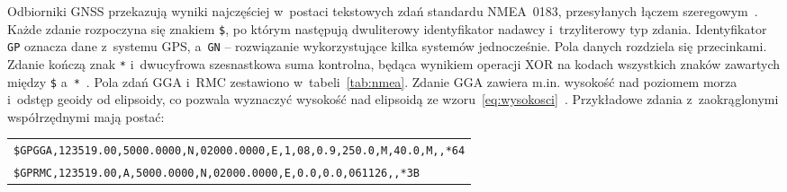 Odbiorniki GNSS przekazują wyniki najczęściej w~postaci tekstowych zdań standardu NMEA~0183, przesyłanych łączem szeregowym~\cite{nmea0183}. Każde zdanie rozpoczyna się znakiem \texttt{\$}, po którym następują dwuliterowy identyfikator nadawcy i~trzyliterowy typ zdania. Identyfikator \texttt{GP} oznacza dane z~systemu GPS, a~\texttt{GN} -- rozwiązanie wykorzystujące kilka systemów jednocześnie. Pola danych rozdziela się przecinkami. Zdanie kończą znak \texttt{*} i~dwucyfrowa szesnastkowa suma kontrolna, będąca wynikiem operacji XOR na kodach wszystkich znaków zawartych między \texttt{\$} a~\texttt{*}~\cite{gpsd_nmea}. Pola zdań GGA i~RMC zestawiono w~tabeli~\ref{tab:nmea}. Zdanie GGA zawiera m.in. wysokość nad poziomem morza i~odstęp geoidy od elipsoidy, co pozwala wyznaczyć wysokość nad elipsoidą ze wzoru~\eqref{eq:wysokosci}~\cite{gpsd_nmea}. Przykładowe zdania z~zaokrąglonymi współrzędnymi mają postać:
\begin{center}
  \small
  \begin{tabular}{@{}l@{}}
    \texttt{\$GPGGA,123519.00,5000.0000,N,02000.0000,E,1,08,0.9,250.0,M,40.0,M,,*64}\\
    \texttt{\$GPRMC,123519.00,A,5000.0000,N,02000.0000,E,0.0,0.0,061126,,*3B}
  \end{tabular}
\end{center}

